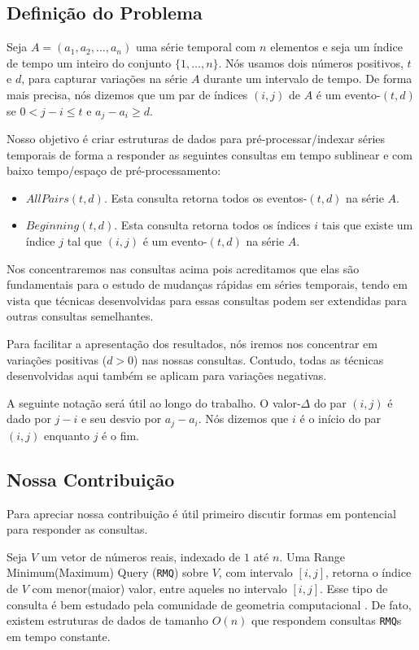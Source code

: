\documentclass[12pt]{article}
\begin{document}
\subsection{Definição do Problema}

Seja $A = (a_1, a_2, \ldots, a_n)$ uma série temporal com $n$ elementos
e seja um índice de tempo um inteiro do conjunto $\{1, \ldots, n\}$. Nós
usamos dois números positivos, $t$ e $d$, para capturar variações na série
$A$ durante um intervalo de tempo. De forma mais precisa, nós dizemos que um
par de índices $(i,j)$ de $A$ é um evento-$(t,d)$ se $0<j - i \le t$ e $a_j - a_i \ge d$.

Nosso objetivo é criar estruturas de dados para pré-processar/indexar séries temporais
de forma a responder as seguintes consultas em tempo sublinear e com baixo tempo/espaço
de pré-processamento:

\begin{itemize}
\item $AllPairs(t, d)$. Esta consulta retorna todos os eventos-$(t,d)$ na série $A$.
\item $Beginning(t, d)$. Esta consulta retorna todos os índices $i$ tais que existe um
índice $j$ tal que $(i,j)$ é um evento-$(t, d)$ na série $A$.
\end{itemize}

Nos concentraremos nas consultas acima pois acreditamos que elas são fundamentais
para o estudo de mudanças rápidas em séries temporais, tendo em vista que 
técnicas desenvolvidas para essas consultas podem ser extendidas para outras
consultas semelhantes.

Para facilitar a apresentação dos resultados, nós iremos nos concentrar
em variações positivas ($d > 0$) nas nossas consultas. Contudo, todas as técnicas
desenvolvidas aqui também se aplicam para variações negativas.

A seguinte notação será útil ao longo do trabalho. O valor-$\Delta$ do par $(i, j)$
é dado por $j - i$ e seu desvio por $a_j - a_i$. Nós dizemos que $i$ é o início
do par $(i, j)$ enquanto $j$ é o fim.

\subsection{Nossa Contribuição}

Para apreciar nossa contribuição é útil primeiro discutir formas
em pontencial para responder as consultas.

Seja $V$ um vetor de números reais, indexado de $1$ até $n$. Uma Range
Minimum(Maximum) Query ({\tt RMQ}) sobre $V$, com intervalo $[i,j]$, retorna
o índice de $V$ com menor(maior) valor, entre aqueles no intervalo $[i,j]$.
Esse tipo de consulta é bem estudado pela comunidade de geometria computacional
\cite{lala}. De fato, existem estruturas de dados de tamanho $O(n)$ que respondem
consultas {\tt RMQ}s em tempo constante.
\end{document}
